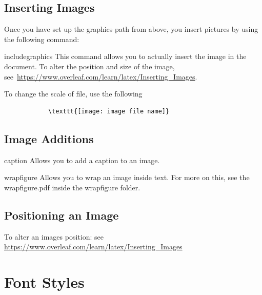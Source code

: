 \documentclass[12pt,hidelinks]{article}
\begin{document}
	\subsection{Inserting Images}
		Once you have set up the graphics path from above, you insert pictures by using the following command:
		\begin{docCommand}{includegraphics}{}
			This command allows you to actually insert the image in the document. To alter the position and size of the image, see~\url{https://www.overleaf.com/learn/latex/Inserting_Images}.\\
		\end{docCommand} \vspace{1mm}
		To change the scale of file, use the following
		\begin{verbatim}
			\texttt{[image: image file name]}
		\end{verbatim}
	\subsection{Image Additions}
		\begin{docCommand}{caption}{}
			Allows you to add a caption to an image.
		\end{docCommand}
		\begin{docEnvironment}{wrapfigure}{}
			Allows you to wrap an image inside text. For more on this, see the wrapfigure.pdf inside the wrapfigure folder.
		\end{docEnvironment}
	\subsection{Positioning an Image}
		To alter an images position: see \url{https://www.overleaf.com/learn/latex/Inserting_Images}
\newpage
{}
\section{Font Styles}
\vspace{10.5cm}
\end{document}
